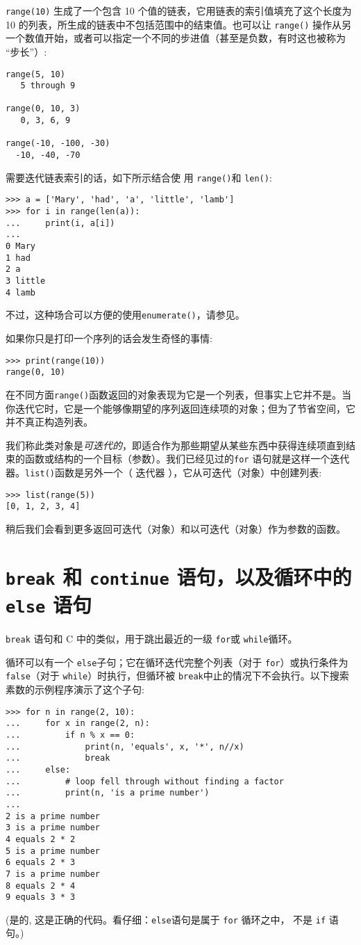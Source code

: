 \texttt{range(10)} 生成了一个包含 10 个值的链表，它用链表的索引值填充了这个长度为 10 的列表，所生成的链表中不包括范围中的结束值。也可以让 \texttt{range()} 操作从另一个数值开始，或者可以指定一个不同的步进值（甚至是负数，有时这也被称为 “步长”）:
\begin{lstlisting}
range(5, 10)
   5 through 9

range(0, 10, 3)
   0, 3, 6, 9

range(-10, -100, -30)
  -10, -40, -70
\end{lstlisting}

需要迭代链表索引的话，如下所示结合使 用 \texttt{range()}和 \texttt{len()}:
\begin{lstlisting}
>>> a = ['Mary', 'had', 'a', 'little', 'lamb']
>>> for i in range(len(a)):
...     print(i, a[i])
...
0 Mary
1 had
2 a
3 little
4 lamb
\end{lstlisting}
不过，这种场合可以方便的使用\texttt{enumerate()}，请参见。

如果你只是打印一个序列的话会发生奇怪的事情:
\begin{lstlisting}
>>> print(range(10))
range(0, 10)
\end{lstlisting}

在不同方面\texttt{range()}函数返回的对象表现为它是一个列表，但事实上它并不是。当你迭代它时，它是一个能够像期望的序列返回连续项的对象；但为了节省空间，它并不真正构造列表。

我们称此类对象是\emph{可迭代的}，即适合作为那些期望从某些东西中获得连续项直到结束的函数或结构的一个目标（参数）。我们已经见过的\texttt{for} 语句就是这样一个迭代器。\texttt{list()}函数是另外一个（ 迭代器 ），它从可迭代（对象）中创建列表:
\begin{lstlisting}
>>> list(range(5))
[0, 1, 2, 3, 4]
\end{lstlisting}

稍后我们会看到更多返回可迭代（对象）和以可迭代（对象）作为参数的函数。
\section{\texttt{break} 和 \texttt{continue} 语句，以及循环中的 \texttt{else} 语句}
\texttt{break} 语句和 C 中的类似，用于跳出最近的一级 \texttt{for}或 \texttt{while}循环。

循环可以有一个 \texttt{else}子句；它在循环迭代完整个列表（对于 \texttt{for}）或执行条件为 \texttt{false}（对于 \texttt{while}）时执行，但循环被 \texttt{break}中止的情况下不会执行。以下搜索素数的示例程序演示了这个子句:
\begin{lstlisting}
>>> for n in range(2, 10):
...     for x in range(2, n):
...         if n % x == 0:
...             print(n, 'equals', x, '*', n//x)
...             break
...     else:
...         # loop fell through without finding a factor
...         print(n, 'is a prime number')
...
2 is a prime number
3 is a prime number
4 equals 2 * 2
5 is a prime number
6 equals 2 * 3
7 is a prime number
8 equals 2 * 4
9 equals 3 * 3
\end{lstlisting}
(是的, 这是正确的代码。看仔细：\texttt{else}语句是属于 \texttt{for} 循环之中， 不是 \texttt{if} 语句。)

